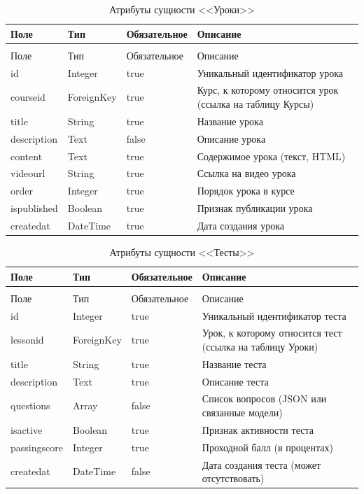 \begin{xltabular}{\textwidth}{|l|l|p{3.2cm}|X|}
	\caption{Атрибуты сущности <<Уроки>>\label{lessons:table}}\\ \hline
	Поле & Тип & Обязательное & Описание \\ \hline
	\endfirsthead
	\\ \hline
	Поле & Тип & Обязательное & Описание \\ \hline
	\endhead
	id & Integer & true & Уникальный идентификатор урока \\ \hline
	courseid & ForeignKey & true & Курс, к которому относится урок (ссылка на таблицу Курсы) \\ \hline
	title & String & true & Название урока \\ \hline
	description & Text & false & Описание урока \\ \hline
	content & Text & true & Содержимое урока (текст, HTML) \\ \hline
	videourl & String & true & Ссылка на видео урока \\ \hline
	order & Integer & true & Порядок урока в курсе \\ \hline
	ispublished & Boolean & true & Признак публикации урока \\ \hline
	createdat & DateTime & true & Дата создания урока \\ \hline
\end{xltabular}


\begin{xltabular}{\textwidth}{|l|l|p{3.2cm}|X|}
	\caption{Атрибуты сущности <<Тесты>>\label{tests:table}}\\ \hline
	Поле & Тип & Обязательное & Описание \\ \hline
	\endfirsthead
	\\ \hline
	Поле & Тип & Обязательное & Описание \\ \hline
	\endhead
	id & Integer & true & Уникальный идентификатор теста \\ \hline
	lessonid & ForeignKey & true & Урок, к которому относится тест (ссылка на таблицу Уроки) \\ \hline
	title & String & true & Название теста \\ \hline
	description & Text & true & Описание теста \\ \hline
	questions & Array & false & Список вопросов (JSON или связанные модели) \\ \hline
	isactive & Boolean & true & Признак активности теста \\ \hline
	passingscore & Integer & true & Проходной балл (в процентах) \\ \hline
	createdat & DateTime & false & Дата создания теста (может отсутствовать) \\ \hline
\end{xltabular}

